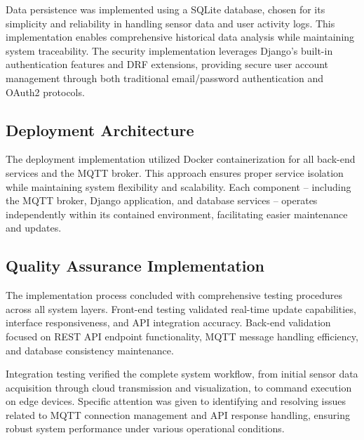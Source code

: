Data persistence was implemented using a SQLite database, chosen for its simplicity and reliability in handling sensor data and user activity logs. This implementation enables comprehensive historical data analysis while maintaining system traceability. The security implementation leverages Django's built-in authentication features and DRF extensions, providing secure user account management through both traditional email/password authentication and OAuth2 protocols.

\subsection{Deployment Architecture}
The deployment implementation utilized Docker containerization for all back-end services and the MQTT broker. This approach ensures proper service isolation while maintaining system flexibility and scalability. Each component -- including the MQTT broker, Django application, and database services -- operates independently within its contained environment, facilitating easier maintenance and updates.

\subsection{Quality Assurance Implementation}
The implementation process concluded with comprehensive testing procedures across all system layers. Front-end testing validated real-time update capabilities, interface responsiveness, and API integration accuracy. Back-end validation focused on REST API endpoint functionality, MQTT message handling efficiency, and database consistency maintenance.

Integration testing verified the complete system workflow, from initial sensor data acquisition through cloud transmission and visualization, to command execution on edge devices. Specific attention was given to identifying and resolving issues related to MQTT connection management and API response handling, ensuring robust system performance under various operational conditions.
